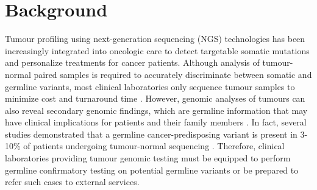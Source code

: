 \documentclass{bmcart}
\begin{document}
\begin{frontmatter}
\begin{abstractbox}
\begin{keyword}
\end{keyword}


\end{abstractbox}
%

\end{frontmatter}



\section*{Background}

Tumour profiling using next-generation sequencing (NGS) technologies has been increasingly integrated into oncologic care to detect targetable somatic mutations and personalize treatments for cancer patients. Although analysis of tumour-normal paired samples is required to accurately discriminate between somatic and germline variants, most clinical laboratories only sequence tumour samples to minimize cost and turnaround time \cite{Raymond2016}. However, genomic analyses of tumours can also reveal secondary genomic findings, which are germline information that may have clinical implications for patients and their family members \cite{Raymond2016}. In fact, several studies demonstrated that a germline cancer-predisposing variant is present in 3-10\% of patients undergoing tumour-normal sequencing \cite{Raymond2016,Meric-Bernstam2016,Schrader2015,Jones2015}. Therefore, clinical laboratories providing tumour genomic testing must be equipped to perform germline confirmatory testing on potential germline variants or be prepared to refer such cases to external services.
\end{document}
